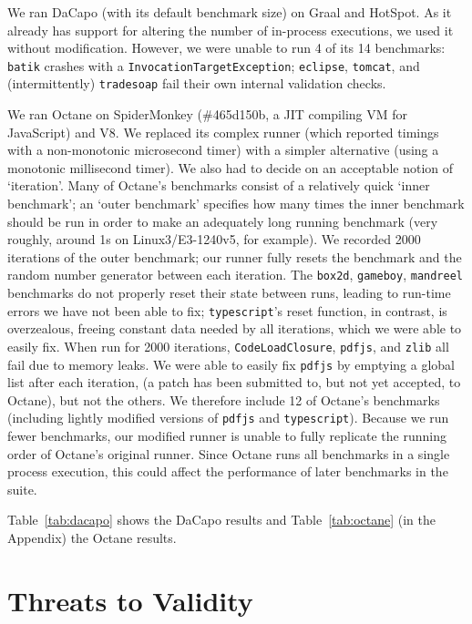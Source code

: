 \documentclass[preprint,numbers,10pt]{sigplanconf}
\newcommand{\bencherseven}{Linux3/E3-1240v5\xspace}
\begin{document}
We ran DaCapo (with its default benchmark size) on Graal and HotSpot. As it already has support for
altering the number of in-process executions, we used it without modification.
However, we were unable to run 4 of its 14 benchmarks: \texttt{batik}
crashes with a \texttt{Invocation\-Target\-Exception}; \texttt{eclipse},
\texttt{tomcat}, and (intermittently) \texttt{tradesoap} fail their own internal
validation checks.

We ran Octane on SpiderMonkey (\#465d150b, a JIT compiling VM for JavaScript) and V8.
We replaced its complex runner (which reported timings with a non-monotonic
microsecond timer) with a simpler alternative (using a monotonic millisecond
timer). We also had to decide on an acceptable notion of `iteration'. Many of Octane's
benchmarks consist of a relatively quick `inner benchmark'; an `outer benchmark'
specifies how many times the inner benchmark should be run in order to make an
adequately long running benchmark (very roughly, around 1s on \bencherseven, for
example). We recorded 2000 iterations of the outer benchmark; our runner
fully resets the benchmark and the random number generator between each
iteration. The \texttt{box2d}, \texttt{gameboy}, \texttt{mandreel} benchmarks do
not properly reset their state between runs, leading to run-time errors we have
not been able to fix; \texttt{typescript}'s reset function, in contrast, is
overzealous, freeing constant data needed by all iterations, which we were able
to easily fix. When run for 2000 iterations, \texttt{CodeLoadClosure},
\texttt{pdfjs}, and \texttt{zlib} all fail due to memory leaks. We were able to
easily fix \texttt{pdfjs} by emptying a global list after each iteration,
(a patch has been submitted to, but not yet accepted, to Octane), but not the
others. We therefore include 12 of Octane's benchmarks (including lightly
modified versions of \texttt{pdfjs} and \texttt{typescript}).
Because we run fewer benchmarks, our modified runner is unable to fully
replicate the running order of Octane's original runner. Since Octane runs all
benchmarks in a single process execution, this could affect the performance of
later benchmarks in the suite.

Table~\ref{tab:dacapo} shows the DaCapo results and Table~\ref{tab:octane} (in
the Appendix) the Octane results.


\section{Threats to Validity}
\label{sec:threats}
\end{document}
